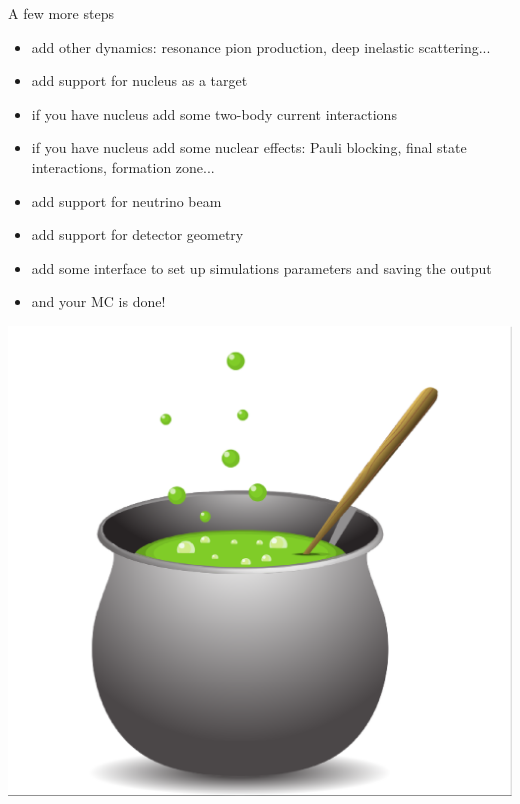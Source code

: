 \begin{slide}{A few more steps}
\null\vfill

  \begin{itemize}
    \item add other dynamics: resonance pion production, deep inelastic scattering...
    \item add support for nucleus as a target 
    \item if you have nucleus add some two-body current interactions
    \item if you have nucleus add some nuclear effects: Pauli blocking, final state interactions, formation zone...
  \end{itemize}
  
  \twocolumn
  {
    \begin{itemize}
      \item add support for neutrino beam
      \item add support for detector geometry
      \item add some interface to set up simulations parameters and saving the output
      \item and your MC is done!
    \end{itemize}
  }
  {
    \includegraphics[width=\columnwidth]{figures/kociol.eps}
  }

\vfill\null
\end{slide}